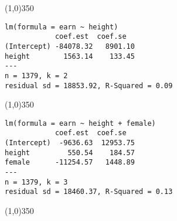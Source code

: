 \documentclass[addpoints,12pt]{exam}
\begin{document}
\noindent\line(1,0){350}

\begin{verbatim}
lm(formula = earn ~ height)
            coef.est  coef.se  
(Intercept) -84078.32   8901.10
height        1563.14    133.45
---
n = 1379, k = 2
residual sd = 18853.92, R-Squared = 0.09
\end{verbatim}

\noindent\line(1,0){350}

\begin{verbatim}
lm(formula = earn ~ height + female)
            coef.est  coef.se  
(Intercept)  -9636.63  12953.75
height         550.54    184.57
female      -11254.57   1448.89
---
n = 1379, k = 3
residual sd = 18460.37, R-Squared = 0.13
\end{verbatim}

\noindent\line(1,0){350}

%
\end{document}
